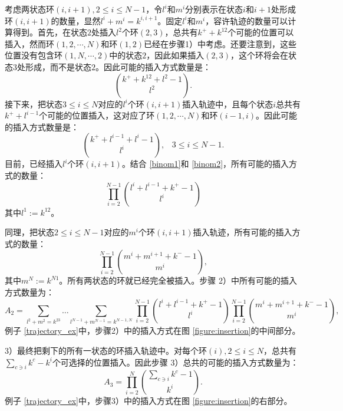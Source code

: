 考虑两状态环$(i, i+1), 2\leqslant i \leqslant N-1$，令$l^i$和$m^i$分别表示在状态$i$和$i+1$处形成环$(i, i+1)$的数量，显然$l^i + m^i = k^{i, i+1}$。固定$l^i$和$m^i$，容许轨迹的数量可以计算得到。首先，在状态$2$处插入$l^2$个环$(2, 3)$，总共有$k^+ + k^{12}$个可能的位置可以插入，然而环$(1,2, \cdots, N)$和环$(1, 2)$已经在步骤1）中考虑。还要注意到，这些位置没有包含环$(1, N, \cdots, 2)$中的状态$2$，因此如果插入$(2,3)$，这个环将会在状态$3$处形成，而不是状态$2$。因此可能的插入方式数量是：
\begin{equation} \label{binom1}
    \binom{k^++k^{12}+l^{2}-1}{l^{2}}.
\end{equation}
接下来，把状态$3 \leqslant i \leqslant N$对应的$l^i$个环$(i, i+1)$插入轨迹中，且每个状态$i$总共有$k^+ + l^{i-1}$个可能的位置插入，这对应了环$(1, 2, \cdots, N)$和环$(i-1, i)$。因此可能的插入方式数量是：
\begin{equation} \label{binom2}
    \binom{k^++l^{i-1}+l^{i}-1}{l^{i}},\;\;\;3\le i\le N-1.
\end{equation}
目前，已经插入$l^i$个环$(i,i+1)$。结合 \ref{binom1}和 \ref{binom2}，所有可能的插入方式的数量：
\begin{equation*}
    \prod_{i=2}^{N-1}\binom{l^{i}+l^{i-1}+k^{+}-1}{l^{i}}
\end{equation*}
其中$l^1:=k^{12}$。

同理，把状态$2 \leqslant i \leqslant N-1$对应的$m^i$个环$(i, i+1)$插入轨迹，所有可能的插入方式的数量：
\begin{equation*}
    \prod_{i=2}^{N-1}\binom{m^{i}+m^{i+1}+k^{-}-1}{m^{i}},
\end{equation*}
其中$m^N:=k^{N1}$。所有两状态的环就已经完全被插入。步骤 2）中所有可能的插入方式数量为：
\begin{equation*}
    A_2 = \sum_{l^{2}+m^{2}=k^{23}}\dots\sum_{l^{N-1}+m^{N-1}=k^{N-1,N}}
    \prod_{i=2}^{N-1}\binom{l^{i}+l^{i-1}+k^{+}-1}{l^{i}}\prod_{i=2}^{N-1}\binom{m^{i}+m^{i+1}+k^{-}-1}{m^{i}},
\end{equation*}
例子 \ref{trajectory_ex}中，步骤2）中的插入方式在图 \ref{figure:insertion}的中间部分。

3）最终把剩下的所有一状态的环插入轨迹中。对每个环$(i), 2 \leqslant i \leqslant N$，总共有$\sum_{c\ni i}k^c-k^i$个可选择的位置插入。因此步骤 3）总共的可能的插入方式数量为：
\begin{equation*}\label{formula:A3}
    A_3 = \prod_{i=2}^N\binom{\sum_{c\ni i}k^{c}-1}{k^{i}}.
\end{equation*}
例子 \ref{trajectory_ex}中，步骤3）中的插入方式在图 \ref{figure:insertion}的右部分。

